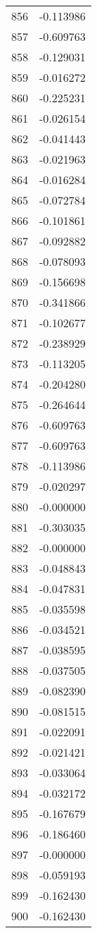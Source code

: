 \documentclass[12pt]{article}
\begin{document}
\begin{longtable}{@{}cc@{}}
856 & -0.113986 \\
857 & -0.609763 \\
858 & -0.129031 \\
859 & -0.016272 \\
860 & -0.225231 \\
861 & -0.026154 \\
862 & -0.041443 \\
863 & -0.021963 \\
864 & -0.016284 \\
865 & -0.072784 \\
866 & -0.101861 \\
867 & -0.092882 \\
868 & -0.078093 \\
869 & -0.156698 \\
870 & -0.341866 \\
871 & -0.102677 \\
872 & -0.238929 \\
873 & -0.113205 \\
874 & -0.204280 \\
875 & -0.264644 \\
876 & -0.609763 \\
877 & -0.609763 \\
878 & -0.113986 \\
879 & -0.020297 \\
880 & -0.000000 \\
881 & -0.303035 \\
882 & -0.000000 \\
883 & -0.048843 \\
884 & -0.047831 \\
885 & -0.035598 \\
886 & -0.034521 \\
887 & -0.038595 \\
888 & -0.037505 \\
889 & -0.082390 \\
890 & -0.081515 \\
891 & -0.022091 \\
892 & -0.021421 \\
893 & -0.033064 \\
894 & -0.032172 \\
895 & -0.167679 \\
896 & -0.186460 \\
897 & -0.000000 \\
898 & -0.059193 \\
899 & -0.162430 \\
900 & -0.162430 \\

\end{longtable}
\end{document}
